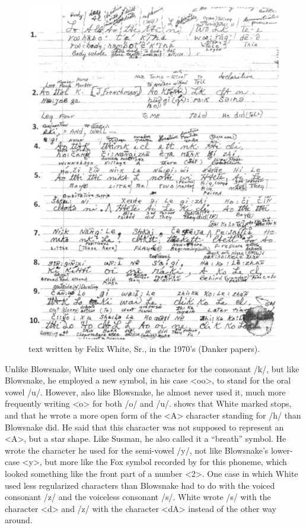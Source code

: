 \documentclass[output=paper]{LSP/langsci}
\begin{document}
\begin{figure}
\includegraphics[width=1\textwidth]{figures/DankerWhiteText}
\caption{  text written by Felix White, Sr., in the 1970's (Danker papers).}
\label{whitetext}
\end{figure}

Unlike Blowsnake, White used only one character for the consonant /k/, but like Blowsnake, he employed a new symbol, in his case <oo>, to stand for the oral vowel /u/. However, also like Blowsnake, he almost never used it, much more frequently writing <o> for both /o/ and /u/.  shows that White marked  stops, and that he wrote a more open form of the <A> character standing for /h/ than Blowsnake did. He said that this character was not supposed to represent an <A>, but a star shape. Like Susman, he also called it a ``breath'' symbol. He wrote the character he used for the semi-vowel /y/, not like Blowsnake's lower-case  <y>, but more like the Fox symbol recorded by \citet{Jones1906} for this phoneme, which looked something like the front part of a number <2>. One case in which White used less regularized  characters than Blowsnake had to do with the voiced consonant /z/ and the voiceless consonant /s/. White wrote /s/ with the character <d> and /z/ with the character <dA> instead of the other way around. 
\end{document}
